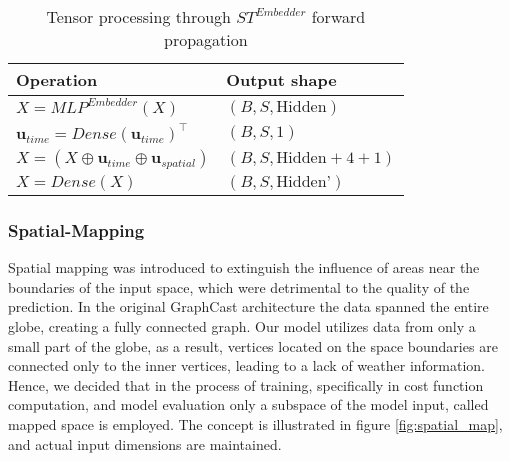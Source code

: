 \begin{table}[!ht]
    \centering
    \begin{tabular}{|l|l|}
        \hline
        \textbf{Operation} & \textbf{Output shape} \\
        \hline
        $X = MLP^{Embedder}(X)$ & $(B, S, \text{Hidden})$ \\
        $\mathbf{u}_{time} = Dense(\mathbf{u}_{time})^{\top}$ & $(B, S, 1)$ \\
        $X = (X \oplus \mathbf{u}_{time} \oplus \mathbf{u}_{spatial})$ & $(B, S, \text{Hidden} + 4 + 1)$ \\
        $X = Dense(X)$ & $(B, S, \text{Hidden'})$ \\
        \hline
    \end{tabular}
    \caption{Tensor processing through $ST^{Embedder}$ forward propagation  }
    \label{tab:st_embed}
\end{table}

\subsubsection{Spatial-Mapping} \label{spatialmapping}
Spatial mapping was introduced to extinguish the influence of areas near the boundaries of the input space, which were detrimental to the quality of the prediction. In the original GraphCast architecture
the data spanned the entire globe, creating a fully connected graph. Our model utilizes data from only a small part of the globe, as a result, vertices located on the space boundaries are connected only to the inner vertices, leading to a lack of weather information. Hence, we decided that in the process of training, specifically in cost function computation, and model evaluation only a subspace of the model input, called mapped space is employed. The concept is illustrated in figure \ref{fig:spatial_map}, and actual input dimensions are maintained.

 